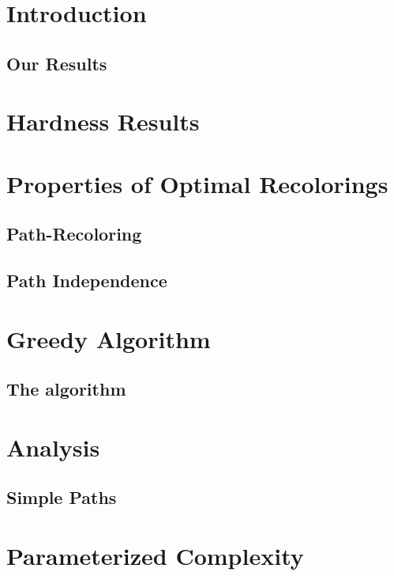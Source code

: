 

\section{Introduction}

	
	\subsection{Our Results}
	

\section{Hardness Results}



\section{Properties of Optimal Recolorings}

	
	\subsection{Path-Recoloring}
	
	
	\subsection{Path Independence}
	


\section{Greedy Algorithm}


	\subsection{The algorithm}
	


\section{Analysis}


	\subsection{Simple Paths}
	

\section{Parameterized Complexity}



